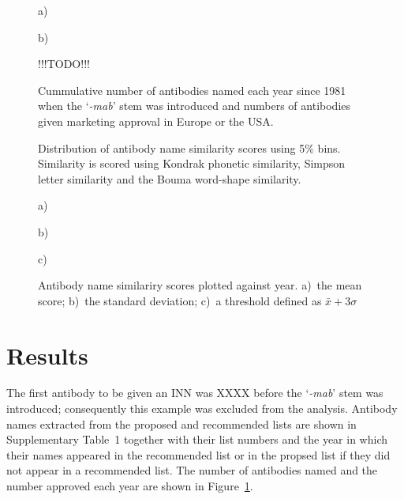 \documentclass{article}
\newcommand{\eg}[1]{`\emph{#1}'}
\begin{document}
\begin{figure}
  \noindent a)
  

  \noindent b)

  !!!TODO!!!
  
  \caption{\label{fig:namesandapproved}Cummulative number of antibodies
  named each year since 1981 when the \eg{-mab} stem was introduced and
  numbers of antibodies given marketing approval in Europe or the
  USA.}
\end{figure}



\begin{figure}
\begin{center}
\end{center}
 \caption{\label{fig:distrib} Distribution of antibody name similarity
   scores using 5\% bins. Similarity is scored using Kondrak phonetic
   similarity, Simpson letter similarity and the Bouma word-shape
   similarity.}
\end{figure}



\begin{figure}
  \noindent a)

\begin{center}
\end{center}

  \noindent b)

\begin{center}
\end{center}

  \noindent c)

\begin{center}
\end{center}

  
  \caption{\label{fig:results} Antibody name similariry
    scores plotted against year. a)~the mean score; b)~the standard
    deviation; c)~a threshold defined as $\bar{x}+3\sigma$}
\end{figure}



\section{Results}
The first antibody to be given an INN was XXXX before the \eg{-mab}
stem was introduced; consequently this example was excluded from the
analysis. Antibody names extracted from the proposed and recommended
lists are shown in Supplementary Table~1 together with their list
numbers and the year in which their names appeared in the recommended
list or in the propsed list if they did not appear in a recommended
list. The number of antibodies named and the number approved each year
are shown in Figure~\ref{fig:namesandapproved}.
\end{document}
